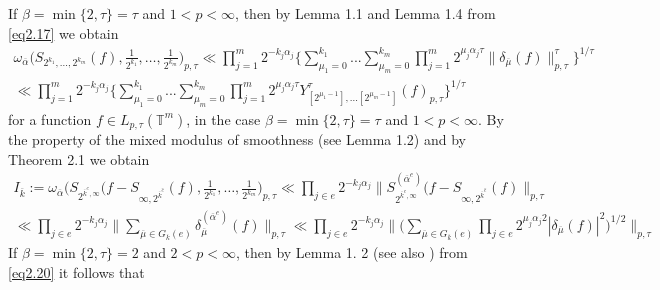 \documentclass[12pt]{article}
\theoremstyle{plain}
\begin{document}
If $\beta = \min\{2, \tau\}=\tau$ and $1< p< \infty$, then by Lemma 1.1 and Lemma 1.4 \cite{4} from \eqref{eq2.17} we obtain
\begin{multline}\label{eq2.19}
\omega_{\overline\alpha}\bigl(S_{2^{k_{1}},...,2^{k_{m}}}(f), \frac{1}{2^{k_{1}}},\ldots , \frac{1}{2^{k_{m}}}\bigr)_{p, \tau}   \ll \prod_{j=1}^{m}2^{-k_{j}\alpha_{j}}\Biggl\{\sum\limits_{\mu_{1}=0}^{k_{1}}...\sum\limits_{\mu_{m}=0}^{k_{m}}\prod_{j=1}^{m}2^{\mu_{j}\alpha_{j}\tau}\|\delta_{\overline{\mu}}(f)\|_{p, \tau}^{\tau}\Biggr\}^{1/\tau}
\\
\ll \prod_{j=1}^{m}2^{-k_{j}\alpha_{j}}\Biggl\{\sum\limits_{\mu_{1}=0}^{k_{1}}...\sum\limits_{\mu_{m}=0}^{k_{m}}\prod_{j=1}^{m}2^{\mu_{j}\alpha_{j}\tau} Y_{[2^{\mu_{1}-1}],... [2^{\mu_{m}-1}]}^{\tau}(f)_{p, \tau}\Biggr\}^{1/\tau}
\end{multline}
for a function 
 $f\in L_{p, \tau}(\mathbb{T}^{m})$, in the case 
  $\beta = \min\{2, \tau\}=\tau$ and $1< p< \infty$.
By the property of the mixed modulus of smoothness (see Lemma 1.2) and by Theorem 2.1 \cite{2} we obtain
\begin{multline}\label{eq2.20}
I_{\overline{k}}:=\omega_{\overline\alpha}\bigl(S_{2^{\overline{k}^{e}, \infty}}(f-S_{\infty, 2^{\overline{k}^{\hat{e}}}}(f), \frac{1}{2^{k_{1}}},\ldots , \frac{1}{2^{k_{m}}}\bigr)_{p, \tau}\ll 
\prod_{j\in e}2^{-k_{j}\alpha_{j}}\|S_{2^{\overline{k}^{e}, \infty}}^{(\overline{\alpha}^{e})}(f-S_{\infty, 2^{\overline{k}^{\hat{e}}}}(f)\|_{p, \tau}
\\
\ll \prod_{j\in e}2^{-k_{j}\alpha_{j}}\biggl\|\sum\limits_{\overline{\mu}\in G_{\overline{k}}(e)}\delta_{\overline{\mu}}^{(\overline{\alpha}^{e})}(f) \biggr\|_{p, \tau} \ll \prod_{j\in e}2^{-k_{j}\alpha_{j}} \biggl\|\biggl(\sum\limits_{\overline{\mu}\in G_{\overline{k}}(e)}\prod_{j\in e}2^{\mu_{j}\alpha_{j}2} |\delta_{\overline{\mu}}(f)|^{2}\biggr)^{1/2} \biggr\|_{p, \tau}
\end{multline}
If $\beta = \min\{2, \tau\}=2$ and $2< p< \infty$, then by Lemma 1. 2 \cite{4} (see also \cite{5}) from \eqref{eq2.20} it follows that
\end{document}
